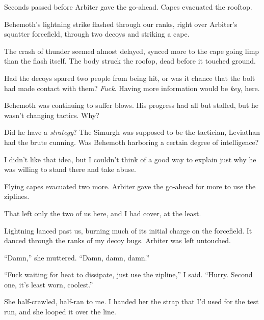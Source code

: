 Seconds passed before Arbiter gave the go-ahead.  Capes evacuated the rooftop.



Behemoth's lightning strike flashed through our ranks, right over Arbiter's squatter forcefield, through two decoys and striking a cape.



The crash of thunder seemed almost delayed, synced more to the cape going limp than the flash itself.  The body struck the roofop, dead before it touched ground.



Had the decoys spared two people from being hit, or was it chance that the bolt had made contact with them?  \emph{Fuck}.  Having more information would be \emph{key}, here.



Behemoth was continuing to suffer blows.  His progress had all but stalled, but he wasn't changing tactics.  Why?



Did he have a \emph{strategy}?  The Simurgh was supposed to be the tactician, Leviathan had the brute cunning.  Was Behemoth harboring a certain degree of intelligence?



I didn't like that idea, but I couldn't think of a good way to explain just why he was willing to stand there and take abuse.



Flying capes evacuated two more.  Arbiter gave the go-ahead for more to use the ziplines.



That left only the two of us here, and I had cover, at the least.



Lightning lanced past us, burning much of its initial charge on the forcefield.  It danced through the ranks of my decoy bugs.  Arbiter was left untouched.



``Damn,'' she muttered.  ``Damn, damn, damn.''



``Fuck waiting for heat to dissipate, just use the zipline,'' I said.  ``Hurry.  Second one, it's least worn, coolest.''



She half-crawled, half-ran to me.  I handed her the strap that I'd used for the test run, and she looped it over the line.



